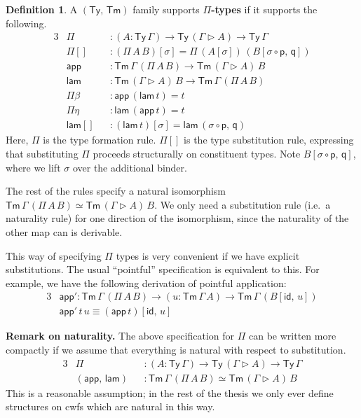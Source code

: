 \documentclass[12pt,a4paper,twoside,openany]{book}
\theoremstyle{remark}
\theoremstyle{definition}
\newtheorem{mydefinition}{Definition}
\newcommand{\ms}[1]{\mathsf{#1}}
\newcommand{\id}{\mathsf{id}}
\newcommand{\Tm}{\mathsf{Tm}}
\newcommand{\Ty}{\mathsf{Ty}}
\newcommand{\ext}{\triangleright}
\newcommand{\p}{\mathsf{p}}
\newcommand{\q}{\mathsf{q}}
\newcommand{\app}{\ms{app}}
\newcommand{\lam}{\ms{lam}}
\begin{document}
\begin{mydefinition}
A $(\Ty,\,\Tm)$ family supports \textbf{$\Pi$-types} if it supports the following.
\begin{alignat*}{3}
  &\Pi           &&: (A : \Ty\,\Gamma) \to \Ty\,(\Gamma\ext A) \to \Ty\,\Gamma\\
  &\ms{\Pi[]}    &&: (\Pi\,A\,B)[\sigma] = \Pi\,(A[\sigma])\,(B[\sigma\circ\p,\,\q])\\
  &\app          &&: \Tm\,\Gamma\,(\Pi\,A\,B) \to \Tm\,(\Gamma \ext A)\,B\\
  &\lam          &&: \Tm\,(\Gamma \ext A)\,B \to \Tm\,\Gamma\,(\Pi\,A\,B)\\
  &\Pi\beta      &&: \app\,(\lam\,t) = t\\
  &\Pi\eta       &&: \lam\,(\app\,t) = t\\
  &\lam[]        &&: (\lam\,t)[\sigma] = \lam\,(\sigma\circ\p,\,\q)
\end{alignat*}
Here, $\Pi$ is the type formation rule. $\ms{\Pi[]}$ is the type substitution
rule, expressing that substituting $\Pi$ proceeds structurally on constituent
types.  Note $B[\sigma\circ\p,\,\q]$, where we lift $\sigma$ over the additional
binder.

The rest of the rules specify a natural isomorphism $\Tm\,\Gamma\,(\Pi\,A\,B)
\simeq \Tm\,(\Gamma \ext A)\,B$. We only need a substitution rule (i.e.\ a
naturality rule) for one direction of the isomorphism, since the naturality of
the other map can is derivable.

This way of specifying $\Pi$ types is very convenient if we have explicit
substitutions. The usual ``pointful'' specification is equivalent to this. For
example, we have the following derivation of pointful application:
\begin{alignat*}{3}
  &\app' : \Tm\,\Gamma\,(\Pi\,A\,B) \to (u : \Tm\,\Gamma\,A) \to \Tm\,\Gamma\,(B[\id,\,u])\\
  &\app'\,t\,u \equiv (\app\,t)[\id,\,u]
\end{alignat*}

\end{mydefinition}

\textbf{Remark on naturality.} The above specification for $\Pi$ can be written
more compactly if we assume that everything is natural with respect to
substitution.
\begin{alignat*}{3}
  &\Pi            &&: (A : \Ty\,\Gamma) \to \Ty\,(\Gamma\ext A) \to \Ty\,\Gamma\\
  & (\app,\,\lam) &&: \Tm\,\Gamma\,(\Pi\,A\,B) \simeq \Tm\,(\Gamma \ext A)\,B
\end{alignat*}
This is a reasonable assumption; in the rest of the thesis we only ever define
structures on cwfs which are natural in this way.
\end{document}
